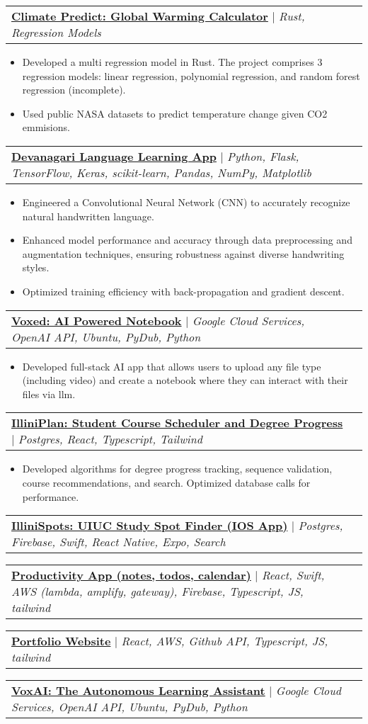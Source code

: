\documentclass[letterpaper,10.99999999999999pt]{article}
\makeatletter
\newcommand{\resumeItem}[1]{
  \item\small{
    {#1 \vspace{-1pt}}
  }
}
\newcommand{\resumeProjectHeading}[2]{
    \item
    \begin{tabular*}{0.97\textwidth}{l@{\extracolsep{\fill}}r}
      \small#1 & #2 \\
    \end{tabular*}\vspace{-6pt}
}
\newcommand{\resumeItemListStart}{\begin{itemize}}
\newcommand{\resumeItemListEnd}{\end{itemize}\vspace{-5pt}}
\makeatother
\begin{document}
        \resumeProjectHeading
          {\textbf{\href{https://www.aidanandrews.info/projects/climatepredict}{Climate Predict: Global Warming Calculator}} $|$ \emph{Rust, Regression Models}}{}
          \resumeItemListStart
            \resumeItem{Developed a multi regression model in Rust. The project comprises 3 regression models: linear regression, polynomial regression, and random forest regression (incomplete).}
            \resumeItem{Used public NASA datasets to predict temperature change given CO2 emmisions.}
          \resumeItemListEnd
          
      \resumeProjectHeading
          {\textbf{\href{https://www.aidanandrews.info/projects/devanagari-web-app}{Devanagari Language Learning App}} $|$ \emph{Python, Flask, TensorFlow, Keras, scikit-learn, Pandas, NumPy, Matplotlib}}{}
          \resumeItemListStart
            \resumeItem{Engineered a Convolutional Neural Network (CNN) to accurately recognize natural handwritten language.}
            \resumeItem{Enhanced model performance and accuracy through data preprocessing and augmentation techniques, ensuring robustness against diverse handwriting styles.}
            \resumeItem{Optimized training efficiency with back-propagation and gradient descent.}
          \resumeItemListEnd

      \resumeProjectHeading
        {\textbf{\href{https://www.aidanandrews.info/projects/voxed}{Voxed: AI Powered Notebook}} $|$ \emph{Google Cloud Services, OpenAI API, Ubuntu, PyDub, Python}}{}
        \resumeItemListStart
          \resumeItem{Developed full-stack AI app that allows users to upload any file type (including video) and create a notebook where they can interact with their files via llm.}
        \resumeItemListEnd
        
        \resumeProjectHeading
        {\textbf{\href{https://www.aidanandrews.info/projects/illini-plan}{IlliniPlan: Student Course Scheduler and Degree Progress}} $|$ \emph{Postgres, React, Typescript, Tailwind}}{}
        \resumeItemListStart
        \resumeItem{Developed algorithms for degree progress tracking, sequence validation, course recommendations, and search. Optimized database calls for performance.}
        \resumeItemListEnd
        
        \resumeProjectHeading
        {\textbf{\href{https://www.aidanandrews.info/projects/illini-spots}{IlliniSpots: UIUC Study Spot Finder (IOS App)}} $|$ \emph{Postgres, Firebase, Swift, React Native, Expo, Search}}{}
        
        \resumeProjectHeading
        {\textbf{\href{https://github.com/aidanandrews22/note-taking-app}{Productivity App (notes, todos, calendar)}} $|$ \emph{React, Swift, AWS (lambda, amplify, gateway), Firebase, Typescript, JS, tailwind}}{}
        \resumeProjectHeading
        {\textbf{\href{https://github.com/aidanandrews22/Portfolio}{Portfolio Website}} $|$ \emph{React, AWS, Github API, Typescript, JS, tailwind}}{}
        \resumeProjectHeading
            {\textbf{\href{https://github.com/aidanandrews22/VoxAI-physical}{VoxAI: The Autonomous Learning Assistant}} $|$ \emph{Google Cloud Services, OpenAI API, Ubuntu, PyDub, Python}}{}
        
\end{document}
